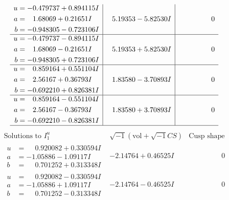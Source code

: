 \documentclass[1p]{elsarticle_modified}
\theoremstyle{definition}
\newcommand{\I}{\sqrt{-1}}
\begin{document}
$$\begin{array}{c|c|c}
\begin{aligned}
u &= -0.479737 + 0.894115 I \\
a &= \phantom{-}1.68069 + 0.21651 I \\
b &= -0.948305 - 0.723106 I\end{aligned}
 & \phantom{-}5.19353 - 5.82530 I & \phantom{-0.000000 } 0 \\ \hline\begin{aligned}
u &= -0.479737 - 0.894115 I \\
a &= \phantom{-}1.68069 - 0.21651 I \\
b &= -0.948305 + 0.723106 I\end{aligned}
 & \phantom{-}5.19353 + 5.82530 I & \phantom{-0.000000 } 0 \\ \hline\begin{aligned}
u &= \phantom{-}0.859164 + 0.551104 I \\
a &= \phantom{-}2.56167 + 0.36793 I \\
b &= -0.692210 + 0.826381 I\end{aligned}
 & \phantom{-}1.83580 - 3.70893 I & \phantom{-0.000000 } 0 \\ \hline\begin{aligned}
u &= \phantom{-}0.859164 - 0.551104 I \\
a &= \phantom{-}2.56167 - 0.36793 I \\
b &= -0.692210 - 0.826381 I\end{aligned}
 & \phantom{-}1.83580 + 3.70893 I & \phantom{-0.000000 } 0\\
 \hline 
 \end{array}$$\newpage$$\begin{array}{c|c|c}  
\text{Solutions to }I^u_{1}& \I (\text{vol} + \sqrt{-1}CS) & \text{Cusp shape}\\
 \hline 
\begin{aligned}
u &= \phantom{-}0.920082 + 0.330594 I \\
a &= -1.05886 - 1.09117 I \\
b &= \phantom{-}0.701252 + 0.313348 I\end{aligned}
 & -2.14764 + 0.46525 I & \phantom{-0.000000 } 0 \\ \hline\begin{aligned}
u &= \phantom{-}0.920082 - 0.330594 I \\
a &= -1.05886 + 1.09117 I \\
b &= \phantom{-}0.701252 - 0.313348 I\end{aligned}
 & -2.14764 - 0.46525 I & \phantom{-0.000000 } 0 \\ \hline\begin{aligned}

\end{aligned}
\end{array}$$
\end{document}
